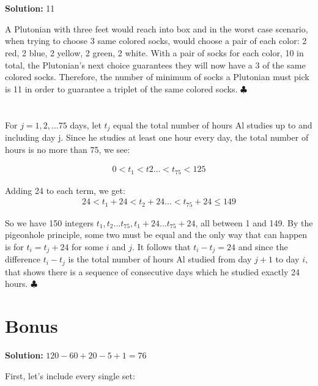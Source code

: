 \documentclass{article}
\begin{document}
\section{}

\textbf{Solution:} 11

A Plutonian with three feet would reach into box and in the worst case scenario, when trying to choose 3 same colored socks, would choose a pair of each color: 2 red, 2 blue, 2 yellow, 2 green, 2 white. With a pair of socks for each color, 10 in total, the Plutonian's next choice guarantees they will now have a 3 of the same colored socks. Therefore, the number of minimum of socks a Plutonian must pick is 11 in order to guarantee a triplet of the same colored socks. $\clubsuit$

\section{}

For $j=1,2,...75$ days, let $t_j$ equal the total number of hours Al studies up to and including day j. Since he studies at least one hour every day, the total number of hours is no more than 75, we see: 

\begin{align*}
   0 < t_1 < t2 ... < t_{75} < 125
\end{align*}


Adding 24 to each term, we get: 
\begin{align*}
   24 < t_1 + 24 < t_2 + 24 ... < t_{75} + 24 \leq 149
\end{align*}

So we have 150 integers $t_1, t_2 ... t_{75}, t_1 + 24 ... t_{75} + 24$, all between 1 and 149. By the pigeonhole principle, some two must be equal and the only way that can happen is for $t_i = t_j + 24$ for some $i$ and $j$. It follows that $t_i - t_j = 24$ and since the difference $t_i - t_j$ is the total number of hours Al studied from day $j + 1$ to day $i$, that shows there is a sequence of consecutive days which he studied exactly 24 hours. $\clubsuit$


\newpage

\section{Bonus}

\textbf{Solution: } $120 - 60 + 20 - 5 + 1 = 76$

First, let's include every single set: 
\end{document}
